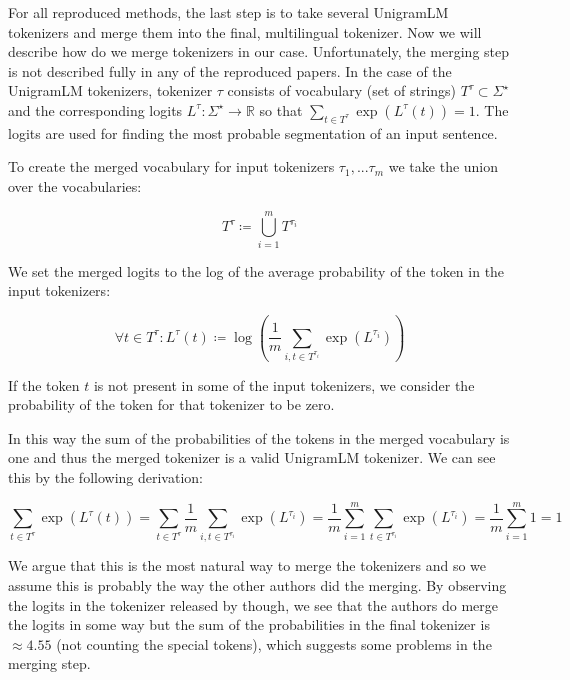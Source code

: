For all reproduced methods, the last step is to take several UnigramLM tokenizers and merge them into the final, multilingual tokenizer. Now we will describe how do we merge tokenizers in our case. Unfortunately, the merging step is not described fully in any of the reproduced papers. In the case of the UnigramLM tokenizers, tokenizer $\tau$ consists of vocabulary (set of strings) $T^\tau \subset \Sigma^\star$ and the corresponding logits $L^\tau: \Sigma^\star \rightarrow \mathbb{R}$ so that $\sum_{t \in T^\tau} \exp(L^\tau(t)) = 1$.  The logits are used for finding the most probable segmentation of an input sentence. 

To create the merged vocabulary for input tokenizers $\tau_1, ... \tau_m$ we take the union over the vocabularies:

\begin{equation}
    T^\tau \coloneqq \bigcup_{i=1}^m T^{\tau_i}
\end{equation}

We set the merged logits to the log of the average probability of the token in the input tokenizers:

\begin{equation}
    \forall t \in T^\tau: L^\tau(t) \coloneqq \log(\frac{1}{m} \sum_{i, t \in T^{\tau_i}} \exp(L^{\tau_i}))
\end{equation}

If the token $t$ is not present in some of the input tokenizers, we consider the probability of the token for that tokenizer to be zero. 

In this way the sum of the probabilities of the tokens in the merged vocabulary is one and thus the merged tokenizer is a valid UnigramLM tokenizer. We can see this by the following derivation:

\begin{equation}
    \sum_{t \in T^\tau} \exp(L^\tau(t)) = \sum_{t \in T^\tau} \frac{1}{m} \sum_{i, t \in T^{\tau_i}} \exp(L^{\tau_i}) = \frac{1}{m} \sum_{i=1}^m \sum_{t \in T^{\tau_i}} \exp(L^{\tau_i}) = \frac{1}{m} \sum_{i=1}^m 1 = 1
\end{equation}


We argue that this is the most natural way to merge the tokenizers and so we assume this is probably the way the other authors did the merging. By observing the logits in the tokenizer released by \citet{liang_xlm-v_2023} though, we see that the authors do merge the logits in some way but the sum of the probabilities in the final tokenizer is $\approx 4.55$ (not counting the special tokens), which suggests some problems in the merging step.


